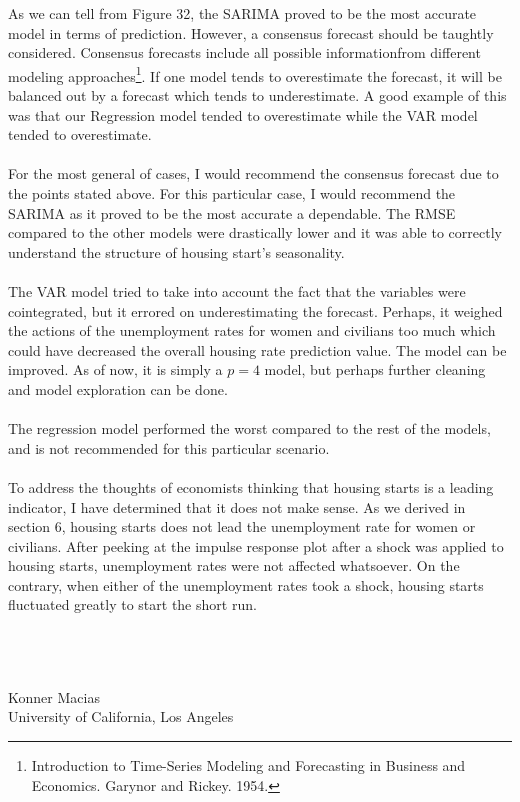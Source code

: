\documentclass[11pt]{article}
\begin{document}
As we can tell from Figure 32, the SARIMA proved to be the most accurate model in terms of prediction. However, a consensus forecast should be taughtly considered. Consensus forecasts include all possible informationfrom different modeling approaches\footnote{Introduction to Time-Series Modeling and Forecasting in Business and Economics. Garynor and Rickey. 1954.}. If one model tends to overestimate the forecast, it will be balanced out by a forecast which tends to underestimate. A good example of this was that our Regression model tended to overestimate while the VAR model tended to overestimate.
\\\\
For the most general of cases, I would recommend the consensus forecast due to the points stated above. For this particular case, I would recommend the SARIMA as it proved to be the most accurate a dependable. The RMSE compared to the other models were drastically lower and it was able to correctly understand the structure of housing start's seasonality.
\\\\
The VAR model tried to take into account the fact that the variables were cointegrated, but it errored on underestimating the forecast. Perhaps, it weighed the actions of the unemployment rates for women and civilians too much which could have decreased the overall housing rate prediction value. The model can be improved. As of now, it is simply a $p=4$ model, but perhaps further cleaning and model exploration can be done.
\\\\
The regression model performed the worst compared to the rest of the models, and is not recommended for this particular scenario.
\\\\
To address the thoughts of economists thinking that housing starts is a leading indicator, I have determined that it does not make sense. As we derived in section 6, housing starts does not lead the unemployment rate for women or civilians. After peeking at the impulse response plot after a shock was applied to housing starts, unemployment rates were not affected whatsoever. On the contrary, when either of the unemployment rates took a shock, housing starts fluctuated greatly to start the short run.
\\\\\\\\
\begin{center}
Konner Macias\\
University of California, Los Angeles
\end{center}
\end{document}
